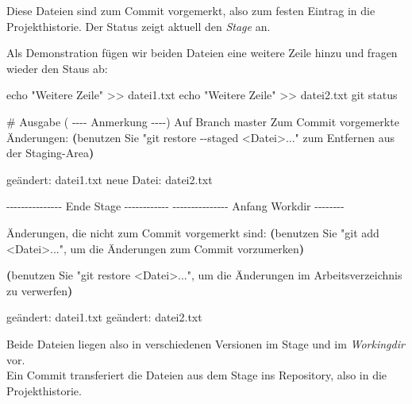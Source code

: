 \documentclass[
  letterpaper,
  DIV=11]{scrreprt}
\newenvironment{Shaded}{\begin{snugshade}}{\end{snugshade}}
\newcommand{\AttributeTok}[1]{\textcolor[rgb]{0.40,0.45,0.13}{#1}}
\newcommand{\BuiltInTok}[1]{\textcolor[rgb]{0.00,0.23,0.31}{#1}}
\newcommand{\CommentTok}[1]{\textcolor[rgb]{0.37,0.37,0.37}{#1}}
\newcommand{\ExtensionTok}[1]{\textcolor[rgb]{0.00,0.23,0.31}{#1}}
\newcommand{\FunctionTok}[1]{\textcolor[rgb]{0.28,0.35,0.67}{#1}}
\newcommand{\KeywordTok}[1]{\textcolor[rgb]{0.00,0.23,0.31}{\textbf{#1}}}
\newcommand{\NormalTok}[1]{\textcolor[rgb]{0.00,0.23,0.31}{#1}}
\newcommand{\OperatorTok}[1]{\textcolor[rgb]{0.37,0.37,0.37}{#1}}
\newcommand{\StringTok}[1]{\textcolor[rgb]{0.13,0.47,0.30}{#1}}
\newcommand{\work}{\textit{Workingdir}\xspace}
\begin{document}
Diese Dateien sind zum Commit vorgemerkt, also zum festen Eintrag in die
Projekthistorie. Der Status zeigt aktuell den \emph{Stage} an.

Als Demonstration fügen wir beiden Dateien eine weitere Zeile hinzu und
fragen wieder den Staus ab:

\begin{Shaded}
\begin{Highlighting}[]
\BuiltInTok{echo} \StringTok{"Weitere Zeile"} \OperatorTok{\textgreater{}\textgreater{}}\NormalTok{ datei1.txt  }
\BuiltInTok{echo} \StringTok{"Weitere Zeile"} \OperatorTok{\textgreater{}\textgreater{}}\NormalTok{ datei2.txt }
\FunctionTok{git}\NormalTok{ status }

\CommentTok{\# Ausgabe ( {-}{-}{-}{-} Anmerkung {-}{-}{-}{-})}
\ExtensionTok{Auf}\NormalTok{ Branch master}
\ExtensionTok{Zum}\NormalTok{ Commit vorgemerkte Änderungen:}
  \KeywordTok{(}\ExtensionTok{benutzen}\NormalTok{ Sie }\StringTok{"git restore {-}{-}staged \textless{}Datei\textgreater{}..."}  
   \ExtensionTok{zum}\NormalTok{ Entfernen aus der Staging{-}Area}\KeywordTok{)}
    
    \ExtensionTok{geändert:}\NormalTok{       datei1.txt}
    \ExtensionTok{neue}\NormalTok{ Datei:     datei2.txt}

\ExtensionTok{{-}{-}{-}{-}{-}{-}{-}{-}{-}{-}{-}{-}{-}{-}{-}}\NormalTok{ Ende Stage }\AttributeTok{{-}{-}{-}{-}{-}{-}{-}{-}{-}{-}{-}{-}}
\ExtensionTok{{-}{-}{-}{-}{-}{-}{-}{-}{-}{-}{-}{-}{-}{-}{-}}\NormalTok{ Anfang Workdir }\AttributeTok{{-}{-}{-}{-}{-}{-}{-}{-}}

\ExtensionTok{Änderungen,}\NormalTok{ die nicht zum Commit vorgemerkt sind:}
  \KeywordTok{(}\ExtensionTok{benutzen}\NormalTok{ Sie }\StringTok{"git add \textless{}Datei\textgreater{}..."}\NormalTok{, um die Änderungen }
   \ExtensionTok{zum}\NormalTok{ Commit vorzumerken}\KeywordTok{)}
  
  \KeywordTok{(}\ExtensionTok{benutzen}\NormalTok{ Sie }\StringTok{"git restore \textless{}Datei\textgreater{}..."}\NormalTok{, }
   \ExtensionTok{um}\NormalTok{ die Änderungen im Arbeitsverzeichnis zu verwerfen}\KeywordTok{)}

    \ExtensionTok{geändert:}\NormalTok{       datei1.txt}
    \ExtensionTok{geändert:}\NormalTok{       datei2.txt}
\end{Highlighting}
\end{Shaded}

Beide Dateien liegen also in verschiedenen Versionen im Stage und im
\work vor.\\
Ein Commit transferiert die Dateien aus dem Stage ins Repository, also
in die Projekthistorie.
\end{document}

